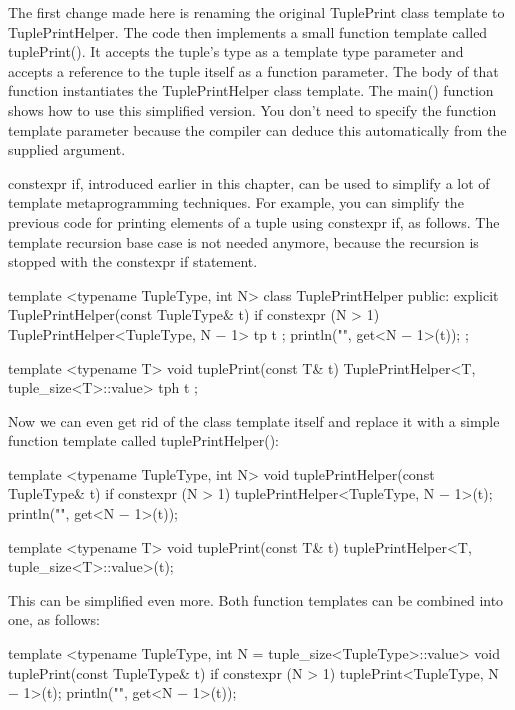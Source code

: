 The first change made here is renaming the original TuplePrint class template to TuplePrintHelper. The code then implements a small function template called tuplePrint(). It accepts the tuple’s type as a template type parameter and accepts a reference to the tuple itself as a function parameter. The body of that function instantiates the TuplePrintHelper class template. The main() function shows how to use this simplified version. You don’t need to specify the function template parameter because the compiler can deduce this automatically from the supplied argument.


constexpr if, introduced earlier in this chapter, can be used to simplify a lot of template metaprogramming techniques. For example, you can simplify the previous code for printing elements of a tuple using constexpr if, as follows. The template recursion base case is not needed anymore, because the recursion is stopped with the constexpr if statement.

\begin{cpp}
template <typename TupleType, int N>
class TuplePrintHelper
{
    public:
        explicit TuplePrintHelper(const TupleType& t) {
            if constexpr (N > 1) {
                TuplePrintHelper<TupleType, N − 1> tp { t };
            }
            println("{}", get<N − 1>(t));
        }
};

template <typename T>
void tuplePrint(const T& t)
{
    TuplePrintHelper<T, tuple_size<T>::value> tph { t };
}
\end{cpp}

Now we can even get rid of the class template itself and replace it with a simple function template called tuplePrintHelper():

\begin{cpp}
template <typename TupleType, int N>
void tuplePrintHelper(const TupleType& t)
{
    if constexpr (N > 1) {
        tuplePrintHelper<TupleType, N − 1>(t);
    }
    println("{}", get<N − 1>(t));
}

template <typename T>
void tuplePrint(const T& t)
{
    tuplePrintHelper<T, tuple_size<T>::value>(t);
}
\end{cpp}

This can be simplified even more. Both function templates can be combined into one, as follows:

\begin{cpp}
template <typename TupleType, int N = tuple_size<TupleType>::value>
void tuplePrint(const TupleType& t)
{
    if constexpr (N > 1) {
        tuplePrint<TupleType, N − 1>(t);
    }
    println("{}", get<N − 1>(t));
}
\end{cpp}

